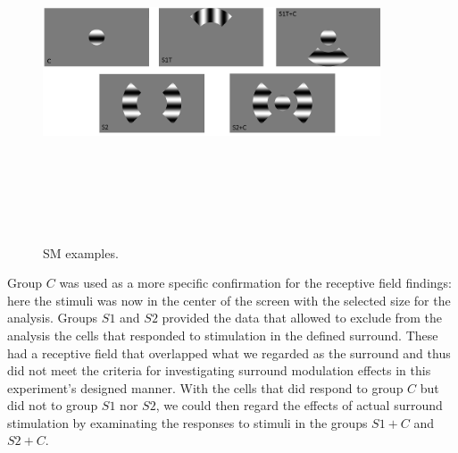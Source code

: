 \begin{figure}[H] \centering \includegraphics[width=10cm,height=10cm,keepaspectratio]{Figures/4.Chapter/SM.png} \caption{SM examples.} \end{figure}

Group $C$ was used as a more specific confirmation for the receptive field findings: here the stimuli was now in the center of the screen with the selected size for the analysis. Groups $S1$ and $S2$ provided the data that allowed to exclude from the analysis the cells that responded to stimulation in the defined surround. These had a receptive field that overlapped what we regarded as the surround and thus did not meet the criteria for investigating surround modulation effects in this experiment's designed manner. With the cells that did respond to group $C$ but did not to group $S1$ nor $S2$, we could then regard the effects of actual surround stimulation by examinating the responses to stimuli in the groups $S1+C$ and $S2+C$.